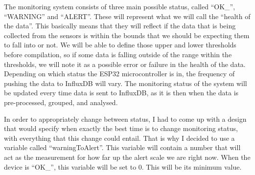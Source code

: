 \documentclass[12pt]{article}
\begin{document}
The monitoring system consists of three main possible status, called ``OK\_'', ``WARNING'' and ``ALERT''. These will represent what we will call the ``health of the data''. This basically means that they will reflect if the data that is being collected from the sensors is within the bounds that we should be expecting them to fall into or not. We will be able to define those upper and lower thresholds before compilation, so if some data is falling outside of the range within the thresholds, we will note it as a possible error or failure in the health of the data. Depending on which status the ESP32 microcontroller is in, the frequency of pushing the data to InfluxDB will vary. The monitoring status of the system will be updated every time data is sent to InfluxDB, as it is then when the data is pre-processed, grouped, and analysed.\par

In order to appropriately change between status, I had to come up with a design that would specify when exactly the best time is to change monitoring status, with everything that this change could entail. That is why I decided to use a variable called ``warningToAlert''. This variable will contain a number that will act as the measurement for how far up the alert scale we are right now. When the device is ``OK\_'', this variable will be set to 0. This will be its minimum value. \par
\end{document}
